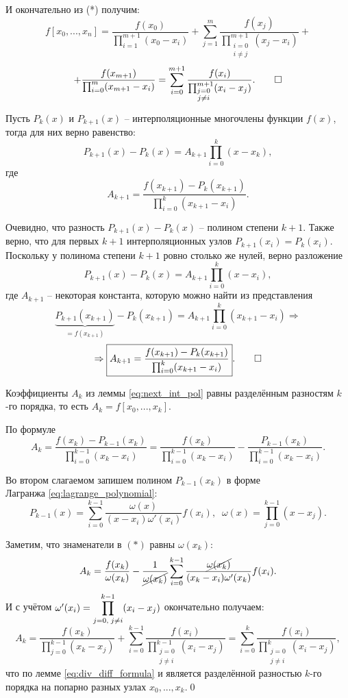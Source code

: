 \documentclass[../main.tex]{subfile}
\begin{document}
	И окончательно из (*) получим:
	\[f[x_0,...,x_n]=\frac{f(x_0)}{\prod_{i=1}^{m+1}(x_0-x_i)}+\sum_{j=1}^{m}
	\frac{f(x_j)}{\prod_{\substack{i=0\\ i\neq j}}^{m+1}(x_j-x_i)}+\]
	\[+\frac{f(x_{m+1})}{\prod_{i=0}^{m}(x_{m+1}-x_i)}=
	\sum_{i=0}^{m+1}\frac{f(x_i)}{\prod_{\substack{j=0\\ j\neq i}}^{m+1}
	(x_i-x_j)}.\qed\]

\begin{lemma}\label{eq:next_int_pol}
	Пусть $P_k(x)$ и $P_{k+1}(x)$ -- интерполяционные многочлены функции $f(x)$,
	тогда для них верно равенство:
	\[P_{k+1}(x)-P_k(x)=A_{k+1}\prod_{i=0}^{k}(x-x_k),\]
	где
	\[A_{k+1}=\frac{f(x_{k+1})-P_k(x_{k+1})}{\prod_{i=0}^{k}(x_{k+1}-x_i)}.\]
\end{lemma}

\beginproof

	Очевидно, что разность $P_{k+1}(x)-P_{k}(x)$ -- полином степени $k+1$.
	Также верно, что для первых $k+1$ интерполяционных узлов $P_{k+1}(x_i)=
	P_{k}(x_i)$. Поскольку у полинома степени $k+1$ ровно столько же нулей,
	верно разложение
	\[P_{k+1}(x)-P_{k}(x)=A_{k+1}\prod_{i=0}^{k}(x-x_i),\]
	где $A_{k+1}$ -- некоторая константа, которую можно найти из представления
	\[\underset{=f(x_{k+1})}{\underbrace{P_{k+1}(x_{k+1})}}-P_{k}(x_{k+1})=
	A_{k+1}\prod_{i=0}^{k}(x_{k+1}-x_i)\Rightarrow\]
	\[\Rightarrow \boxed{A_{k+1}=\frac{f(x_{k+1})-P_k(x_{k+1})}
	{\prod_{i=0}^{k}(x_{k+1}-x_i)}}.\qed\]

\begin{lemma}\label{eq:newton_koef_formula}
	Коэффициенты $A_k$ из леммы \eqref{eq:next_int_pol} равны разделённым
	разностям $k$-го порядка, то есть $A_k=f[x_0,...,x_k].$

\end{lemma}

\beginproof

	По формуле
	\[A_k=\frac{f(x_k)-P_{k-1}(x_k)}{\prod_{i=0}^{k-1}(x_k-x_i)}=
	\frac{f(x_k)}{\prod_{i=0}^{k-1}(x_k-x_i)} - \frac{P_{k-1}(x_k)}
	{\prod_{i=0}^{k-1}(x_k-x_i)}.\tag{*}\]

	Во втором слагаемом запишем полином $P_{k-1}(x_k)$ в форме\\Лагранжа
	\eqref{eq:lagrange_polynomial}:
	\[P_{k-1}(x)=\sum_{i=0}^{k-1}\frac{\omega(x)}{(x-x_i)\omega'(x_i)}
	f(x_i),\;\;
	\omega(x)=\prod_{j=0}^{k-1}(x-x_j).\]

	Заметим, что знаменатели в $(*)$ равны $\omega(x_k)$:
	\[A_k=\frac{f(x_k)}{\omega(x_k)} - \frac{1}{\cancel{\omega(x_k)}}
	\sum_{i=0}^{k-1}\frac{\cancel{\omega(x_k)}}{(x_k-x_i)\omega'(x_k)}
	f(x_i).\]
	И с учётом
	$\omega'(x_i)=\mathlarger\prod_{j=0,\;j\ne i}^{k-1}(x_i-x_j)$
	окончательно получаем:
	\[A_k=\frac{f(x_k)}{\prod_{j=0}^{k-1}(x_k-x_j)} +
	\sum_{i=0}^{k-1}\frac{f(x_i)}{\prod_{\substack{j=0\\j\ne i}}^{k-1}
	(x_i-x_j)}=\sum_{i=0}^{k}\frac{f(x_i)}{\prod_{\substack{j=0\\j\ne i}}^
	{k}(x_i-x_j)},\]
	что по лемме \eqref{eq:div_diff_formula} и является разделённой
	разностью $k$-го порядка на попарно разных узлах $x_0,...,x_k$.\qed
\end{document}
